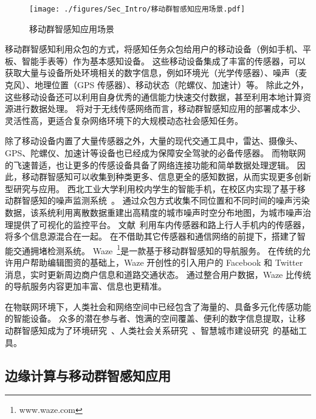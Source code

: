 \begin{figure}[!h]
  \centering
  \texttt{[image: ./figures/Sec\_Intro/移动群智感知应用场景.pdf]}
  \vspace{-0.5em}
  \caption{移动群智感知应用场景}
  \label{Figure_MCS_Application}
\end{figure}

移动群智感知利用众包的方式，将感知任务众包给用户的移动设备（例如手机、平板、智能手表等）作为基本感知设备。
这些移动设备集成了丰富的传感器，可以获取大量与设备所处环境相关的数字信息，例如环境光（光学传感器）、噪声（麦克风）、地理位置（GPS 传感器）、移动状态（陀螺仪、加速计）等。
除此之外，这些移动设备还可以利用自身优秀的通信能力快速交付数据，甚至利用本地计算资源进行数据处理。
将对于无线传感网络而言，移动群智感知应用的部署成本少、灵活性高，更适合复杂网络环境下的大规模动态社会感知任务。

除了移动设备内置了大量传感器之外，大量的现代交通工具中，雷达、摄像头、GPS、陀螺仪、加速计等设备也已经成为保障安全驾驶的必备传感器。
而物联网的飞速普适，也让更多的传感设备具备了网络连接功能和简单数据处理逻辑。
因此，移动群智感知可以收集到种类更多、信息更全的感知数据，从而实现更多创新型研究与应用。
西北工业大学利用校内学生的智能手机，在校区内实现了基于移动群智感知的噪声监测系统~\cite{CNKI/2014/CSNSYu}。
通过众包方式收集不同位置和不同时间的噪声污染数据，该系统利用离散数据重建出高精度的城市噪声时空分布地图，为城市噪声治理提供了可视化的监控平台。
文献~\cite{DBLP:conf/wcnc/AliAEJH12}利用车内传感器和路上行人手机内的传感器，将多个信息源混合在一起。
在不借助其它传感器和通信网络的前提下，搭建了智能交通拥堵检测系统。
Waze~\footnote{www.waze.com}是一款基于移动群智感知的导航服务。
在传统的允许用户帮助编辑图资的基础上，Waze 开创性的引入用户的 Facebook 和 Twitter 消息，实时更新周边商户信息和道路交通状态。
通过整合用户数据，Waze 比传统的导航服务内容更加丰富、信息也更精准。

在物联网环境下，人类社会和网络空间中已经包含了海量的、具备多元化传感功能的智能设备。
众多的潜在参与者、饱满的空间覆盖、便利的数字信息提取，让移动群智感知成为了环境研究~\cite{DBLP:conf/sensys/DuttaAKMMWW09}、人类社会关系研究~\cite{DBLP:conf/globecom/AslIAM13}、智慧城市建设研究~\cite{DBLP:journals/cm/WangZWCHM16}的基础工具。

\subsection{边缘计算与移动群智感知应用}

